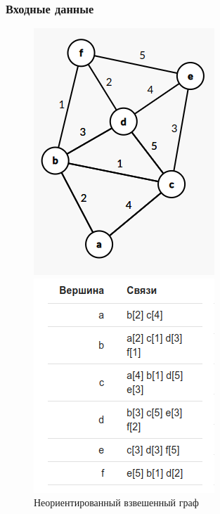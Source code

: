 \subsubsection{Входные данные}
\begin{figure}[H]
  \begin{minipage}{0.5\textwidth}
    \centering\includegraphics[width=0.6\linewidth]{figs/task-7/graph-7.png}
  \end{minipage}
  \begin{minipage}{0.5\textwidth}
    \centering\includegraphics[width=0.6\linewidth]{figs/task-7/adj-7.png}
  \end{minipage}
  \caption{Неориентированный взвешенный граф}
\end{figure}

